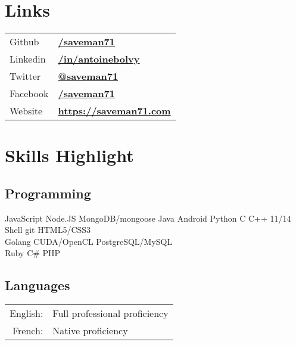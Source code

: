 \documentclass[
  english,
  a4paper
]{resume-openfont}
\begin{document}
\begin{minipage}[t]{0.31\textwidth}
\section{Links}
\begin{tabular}{@{}l@{\hskip 0.5em}l}
Github & \href{https://github.com/saveman71}{\bf /saveman71} \\
Linkedin & \href{https://www.linkedin.com/in/antoinebolvy}{\bf /in/antoinebolvy} \\
Twitter & \href{https://twitter.com/saveman71}{\bf @saveman71} \\
Facebook & \href{https://facebook.com/saveman71}{\bf /saveman71} \\
Website & \href{https://saveman71.com}{\bf https://saveman71.com} \\
\end{tabular}
\sectionsep


\section{Skills Highlight}
\subsection{Programming}
\vspace{2pt}
JavaScript \textbullet{} Node.JS \textbullet{} MongoDB/mongoose \textbullet{} Java \textbullet{} Android \textbullet{} Python \textbullet{} C \textbullet{} C++ 11/14 \textbullet{} Shell \textbullet{}  \textbullet{} git \textbullet{} HTML5/CSS3\\
Golang \textbullet{} CUDA/OpenCL \textbullet{} PostgreSQL/MySQL\\
Ruby \textbullet{} C\# \textbullet{} PHP\\
\sectionsep

\subsection{Languages}
\vspace{2pt}
\begin{tabular}{@{}r@{\hskip 0.5em}l}
English: &Full professional proficiency \\
French: &Native proficiency
\end{tabular}
\sectionsep


\end{minipage}
\end{document}
